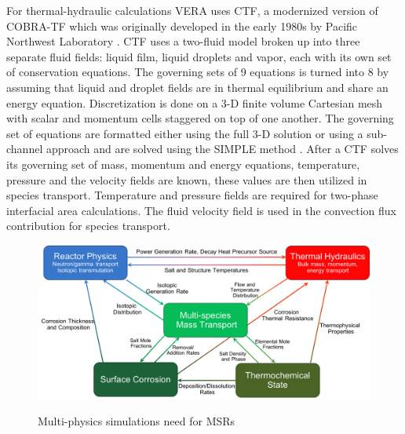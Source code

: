  
For thermal-hydraulic calculations VERA uses CTF, a modernized version of COBRA-TF which was originally developed in the early 1980s by Pacific Northwest Laboratory \cite{zack2018}. CTF uses a two-fluid model broken up into three separate fluid fields: liquid film, liquid droplets and vapor, each with its own set of conservation equations. The governing sets of 9 equations is turned into 8 by assuming that liquid and droplet fields are in thermal equilibrium and share an energy equation. Discretization is done on a 3-D finite volume Cartesian mesh with scalar and momentum cells staggered on top of one another. The governing set of equations are formatted either using the full 3-D solution or using a sub-channel approach and are solved using the SIMPLE method \cite{salko2017}. After a CTF solves its governing set of mass, momentum and energy equations, temperature, pressure and the velocity fields are known, these values are then utilized in species transport. Temperature and pressure fields are required for two-phase interfacial area calculations. The fluid velocity field is used in the convection flux contribution for species transport.  

\vspace{12.7mm} %

\begin{figure}[h]
  \centering
  \includegraphics[width=6in]{images/multiphysics.png}\\
  \caption{Multi-physics simulations need for MSRs}
  \label{fig:multiphysicsMSR}
\end{figure}